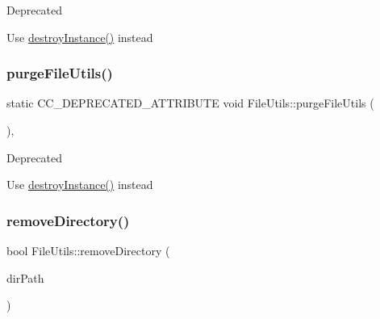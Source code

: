 \begin{DoxyRefDesc}{Deprecated}
\item[\hyperlink{deprecated__deprecated000115}{Deprecated}]Use \hyperlink{classFileUtils_abc5586f1eccca854b227e3cd8738cefd}{destroy\+Instance()} instead \end{DoxyRefDesc}
\mbox{\label{classFileUtils_ac420e697b4b0c1a3c5e9711dcaa66c31}} 
\subsubsection{\texorpdfstring{purge\+File\+Utils()}{purgeFileUtils()}\hspace{0.1cm}{\footnotesize\ttfamily [2/2]}}
{\footnotesize\ttfamily static C\+C\+\_\+\+D\+E\+P\+R\+E\+C\+A\+T\+E\+D\+\_\+\+A\+T\+T\+R\+I\+B\+U\+TE void File\+Utils\+::purge\+File\+Utils (\begin{DoxyParamCaption}{ }\end{DoxyParamCaption})\hspace{0.3cm}{\ttfamily [inline]}, {\ttfamily [static]}}

\begin{DoxyRefDesc}{Deprecated}
\item[\hyperlink{deprecated__deprecated000350}{Deprecated}]Use \hyperlink{classFileUtils_abc5586f1eccca854b227e3cd8738cefd}{destroy\+Instance()} instead \end{DoxyRefDesc}
\mbox{\label{classFileUtils_ad64d866c014013817c54582924f9592e}} 
\subsubsection{\texorpdfstring{remove\+Directory()}{removeDirectory()}\hspace{0.1cm}{\footnotesize\ttfamily [1/3]}}
{\footnotesize\ttfamily bool File\+Utils\+::remove\+Directory (\begin{DoxyParamCaption}\item[{const std\+::string \&}]{dir\+Path }\end{DoxyParamCaption})\hspace{0.3cm}{\ttfamily [virtual]}}

